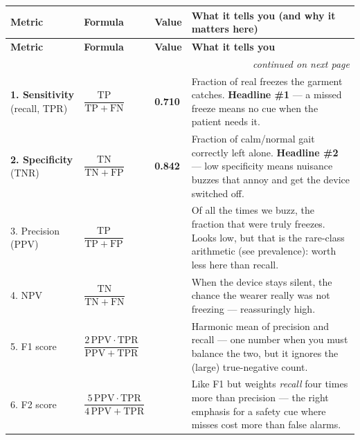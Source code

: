 \documentclass[11pt]{article}
\begin{document}
{\footnotesize
\setlength{\tabcolsep}{4pt}
\renewcommand{\arraystretch}{1.35}
\begin{longtable}{@{}p{2.45cm} p{3.05cm} >{\centering\arraybackslash}p{0.9cm} p{8.1cm}@{}}
\toprule
\textbf{Metric} & \textbf{Formula} & \textbf{Value} & \textbf{What it tells you (and why it matters here)}\\
\midrule
\endfirsthead
\toprule
\textbf{Metric} & \textbf{Formula} & \textbf{Value} & \textbf{What it tells you}\\
\midrule
\endhead
\midrule \multicolumn{4}{r}{\footnotesize\itshape continued on next page}\\
\endfoot
\bottomrule
\endlastfoot

\textbf{1. Sensitivity} \newline (recall, TPR) &
$\dfrac{\mathrm{TP}}{\mathrm{TP}+\mathrm{FN}}$ & \textbf{0.710} &
Fraction of real freezes the garment catches. \textbf{Headline \#1} --- a missed
freeze means no cue when the patient needs it.\\

\textbf{2. Specificity} \newline (TNR) &
$\dfrac{\mathrm{TN}}{\mathrm{TN}+\mathrm{FP}}$ & \textbf{0.842} &
Fraction of calm/normal gait correctly left alone. \textbf{Headline \#2} --- low
specificity means nuisance buzzes that annoy and get the device switched off.\\

3. Precision \newline (PPV) &
$\dfrac{\mathrm{TP}}{\mathrm{TP}+\mathrm{FP}}$ & 0.321 &
Of all the times we buzz, the fraction that were truly freezes. Looks low, but
that is the rare-class arithmetic (see prevalence): worth less here than recall.\\

4. NPV &
$\dfrac{\mathrm{TN}}{\mathrm{TN}+\mathrm{FN}}$ & 0.965 &
When the device stays silent, the chance the wearer really was not freezing ---
reassuringly high.\\

5. F1 score &
$\dfrac{2\,\mathrm{PPV}\cdot\mathrm{TPR}}{\mathrm{PPV}+\mathrm{TPR}}$ & 0.442 &
Harmonic mean of precision and recall --- one number when you must balance the
two, but it ignores the (large) true-negative count.\\

6. F2 score &
$\dfrac{5\,\mathrm{PPV}\cdot\mathrm{TPR}}{4\,\mathrm{PPV}+\mathrm{TPR}}$ & 0.571 &
Like F1 but weights \emph{recall} four times more than precision --- the right
emphasis for a safety cue where misses cost more than false alarms.\\


\end{longtable}}
\end{document}

